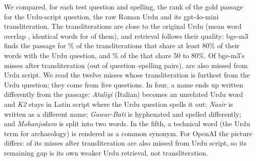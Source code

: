 We compared, for each test question and spelling, the rank of the gold passage for the Urdu-script question, the raw Roman Urdu and its gpt-4o-mini transliteration. The transliterations are close to the original Urdu (mean word overlap \TrJaccard, identical words for \TrExact{} of them), and retrieval follows their quality: bge-m3 finds the passage for \ErrBgeHighOverlap\% of the \ErrNHighOverlap{} transliterations that share at least 80\% of their words with the Urdu question, and \ErrBgeLowOverlap\% of the \ErrNLowOverlap{} that share 50 to 80\%. Of bge-m3's \ErrBgeMiss{} misses after transliteration (out of \ErrBgePairs{} question--spelling pairs), \ErrBgeUrduAlso{} are also missed from Urdu script. We read the twelve misses whose transliteration is furthest from the Urdu question; they come from five questions. In four, a name ends up written differently from the passage: \textit{Ataliyi} (Italian) becomes an unrelated Urdu word and \textit{K2} stays in Latin script where the Urdu question spells it out; \textit{Nasir} is written as a different name; \textit{Gawar-Bati} is hyphenated and spelled differently; and \textit{Mohanjodaro} is split into two words. In the fifth, a technical word (the Urdu term for archaeology) is rendered as a common synonym. For OpenAI the picture differs: \ErrOpenaiUrduAlso{} of its \ErrOpenaiMiss{} misses after transliteration are also missed from Urdu script, so its remaining gap is its own weaker Urdu retrieval, not transliteration.
